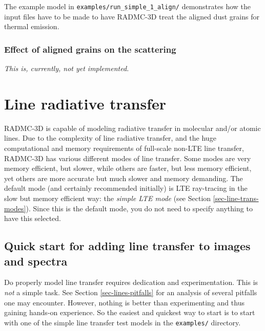 \documentclass{report}
\begin{document}
The example model in {\small\tt examples/run\_simple\_1\_align/}
demonstrates how the input files have to be made to have RADMC-3D treat the
aligned dust grains for thermal emission.

\subsection{Effect of aligned grains on the scattering}
\label{sec-align-scat}
%
{\em This is, currently, not yet implemented.}





\chapter{Line radiative transfer}
\label{chap-line-transfer}
%
RADMC-3D is capable of modeling radiative transfer in molecular and/or
atomic lines. Due to the complexity of line radiative transfer, and the huge
computational and memory requirements of full-scale non-LTE line transfer,
RADMC-3D has various different modes of line transfer. Some modes are very
memory efficient, but slower, while others are faster, but less memory
efficient, yet others are more accurate but much slower and memory
demanding. The default mode (and certainly recommended initially) is LTE
ray-tracing in the slow but memory efficient way: the {\em simple LTE mode}
(see Section \ref{sec-line-trans-modes}). Since this is the default mode,
you do not need to specify anything to have this selected.


\section{Quick start for adding line transfer to images and spectra}
Do properly model line transfer requires dedication and experimentation.
This is {\em not} a simple task. See Section \ref{sec-lines-pitfalls} for an
analysis of several pitfalls one may encounter. However, nothing is better
than experimenting and thus gaining hands-on experience. So the easiest and
quickest way to start is to start with one of the simple line transfer test
models in the {\small\tt examples/} directory. 
\end{document}
